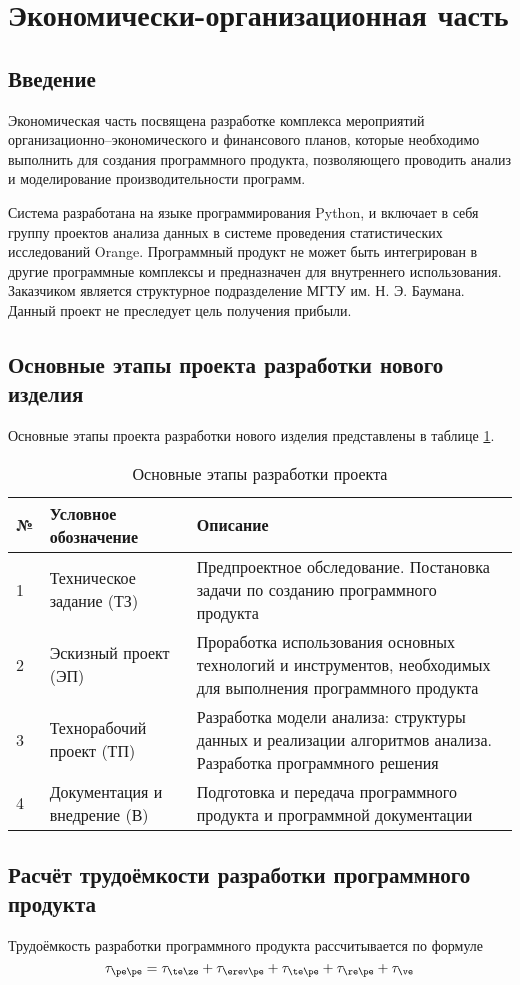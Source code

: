 \section{Экономически-организационная часть}
\subsection{Введение}
Экономическая часть посвящена разработке комплекса мероприятий организационно–экономического и финансового планов, которые необходимо выполнить для создания программного продукта, позволяющего проводить анализ и моделирование производительности программ.

Система разработана на языке программирования Python, и включает в себя группу проектов анализа данных в системе проведения статистических исследований Orange. Программный продукт не может быть интегрирован в другие программные комплексы и предназначен для внутреннего использования. Заказчиком является структурное подразделение МГТУ им. Н. Э. Баумана.
Данный проект не преследует цель получения прибыли.

\subsection{Основные этапы проекта разработки нового изделия}
Основные этапы проекта разработки нового изделия представлены в таблице \ref{tab:development-stages}.

\begin{table}[H]
    \caption{\label{tab:development-stages}Основные этапы разработки проекта}
    \begin{tabular}[H]{|l|p{5cm}|p{8cm}|}
        \hline
        № & Условное обозначение & Описание\\
        \hline
        1 & Техническое задание (ТЗ) & Предпроектное обследование. Постановка задачи по созданию программного продукта\\
        \hline
        2 & Эскизный проект (ЭП) & Проработка использования основных технологий и инструментов, необходимых для выполнения программного продукта\\
        \hline
        3 & Технорабочий проект (ТП) & Разработка модели анализа: структуры данных и реализации алгоритмов анализа. Разработка программного решения\\
        \hline
        4 & Документация и внедрение (В) & Подготовка и передача программного продукта и программной документации\\
        \hline
    \end{tabular}
\end{table}

\subsection{Расчёт трудоёмкости разработки программного продукта}
Трудоёмкость разработки программного продукта рассчитывается по формуле
\begin{equation*}
\tau_{\pe\pe} = \tau_{\te\ze} + \tau_{\erev\pe} + \tau_{\te\pe} + \tau_{\re\pe} + \tau_{\ve}
\end{equation*}